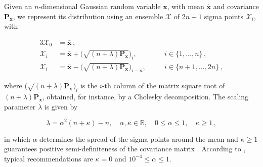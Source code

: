Given an $n$-dimensional Gaussian random variable $\bm{x}$, with mean $\bar{\bm{x}}$ and covariance $\bm{P}_{\bm{x}}$, we represent its distribution using an ensemble $\bm{\mathcal{X}}$ of $2n + 1$ sigma points $\mathcal{X}_i$, with

\begin{alignat}{3}
  \mathcal{X}_0 &= \bar{\bm{x}}\,, \\
  \mathcal{X}_i &= \bar{\bm{x}} + \Big(\sqrt{(n + \lambda) \bm{P}_{\bm{x}}}\Big)_i, &&i \in \{1, \dots, n\}\,, \\
  \mathcal{X}_i &= \bar{\bm{x}} - \Big(\sqrt{(n + \lambda) \bm{P}_{\bm{x}}}\Big)_{i-n}, \quad &&i \in \{n+1, \dots, 2n\} \,,
\end{alignat}

\noindent
where $\big(\sqrt{(n + \lambda) \bm{P}_{\bm{x}}}\big)_i$ is the $i$-th column of the matrix square root of $(n + \lambda) \bm{P}_{\bm{x}}$, obtained, for instance, by a Cholesky decomposition. The scaling parameter $\lambda$ is given by

\begin{equation}
  \lambda = \alpha^2 (n + \kappa) - n, \quad \alpha,\kappa \in \mathbb{R}, \quad 0 \leq \alpha \leq 1, \quad \kappa \geq 1\,,
\end{equation}

\noindent 
in which $\alpha$ determines the spread of the sigma points around the mean \cite{julier1995new} and $\kappa \geq 1$ guarantees positive semi-definiteness of the covariance matrix \cite{merwe2000scented}. According to \cite{wan2001unscented}, typical recommendations are $\kappa = 0$ and $10^{-4} \leq \alpha \leq 1$.

